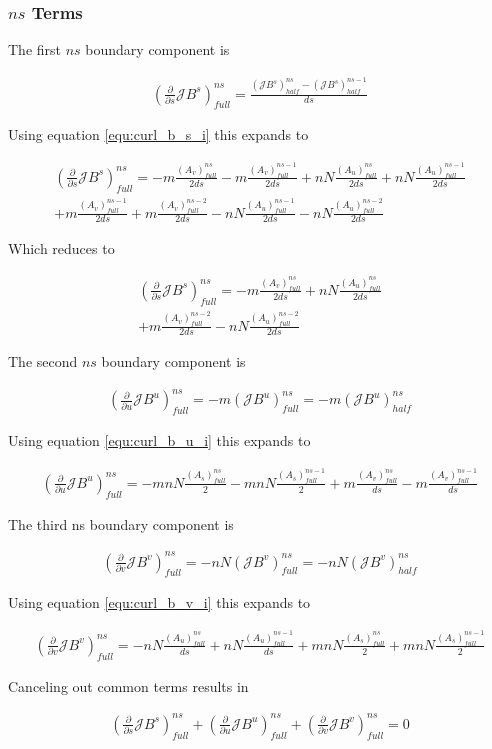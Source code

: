 \documentclass[11pt]{article}
\newcommand{\brackets}[1]{\left(#1\right)}
\newcommand{\equ}[2]{
	\begin{equation}
    \begin{split}
	#1
	\label{#2}
	\end{split}
	\end{equation}
}
\begin{document}
\subsubsection{$ns$ Terms}
The first $ns$ boundary component is
\equ{
\brackets{\frac{\partial}{\partial s}\mathcal{J}B^{s}}^{ns}_{full}=\frac{\brackets{\mathcal{J}B^{s}}^{ns}_{half}-\brackets{\mathcal{J}B^{s}}^{ns-1}_{half}}{ds}
}{equ:div_jb_s_ns}
Using equation \ref{equ:curl_b_s_i} this expands to
\equ{
\brackets{\frac{\partial}{\partial s}\mathcal{J}B^{s}}^{ns}_{full}=-m\frac{\brackets{A_{v}}^{ns}_{full}}{2ds}-m\frac{\brackets{A_{v}}^{ns-1}_{full}}{2ds}+nN\frac{\brackets{A_{u}}^{ns}_{full}}{2ds}+nN\frac{\brackets{A_{u}}^{ns-1}_{full}}{2ds}\\
+m\frac{\brackets{A_{v}}^{ns-1}_{full}}{2ds}+m\frac{\brackets{A_{v}}^{ns-2}_{full}}{2ds}-nN\frac{\brackets{A_{u}}^{ns-1}_{full}}{2ds}-nN\frac{\brackets{A_{u}}^{ns-2}_{full}}{2ds}
}{equ:div_jb_s_ns_1}
Which reduces to
\equ{
\brackets{\frac{\partial}{\partial s}\mathcal{J}B^{s}}^{ns}_{full}=-m\frac{\brackets{A_{v}}^{ns}_{full}}{2ds}+nN\frac{\brackets{A_{u}}^{ns}_{full}}{2ds}\\
+m\frac{\brackets{A_{v}}^{ns-2}_{full}}{2ds}-nN\frac{\brackets{A_{u}}^{ns-2}_{full}}{2ds}
}{equ:div_jb_s_ns_2}

The second $ns$ boundary component is
\equ{
\brackets{\frac{\partial}{\partial u}\mathcal{J}B^{u}}^{ns}_{full}=-m\brackets{\mathcal{J}B^{u}}^{ns}_{full}=-m\brackets{\mathcal{J}B^{u}}^{ns}_{half}
}{equ:div_jb_u_ns}
Using equation \ref{equ:curl_b_u_i} this expands to
\equ{
\brackets{\frac{\partial}{\partial u}\mathcal{J}B^{u}}^{ns}_{full}=-mnN\frac{\brackets{A_{s}}^{ns}_{full}}{2}-mnN\frac{\brackets{A_{s}}^{ns-1}_{full}}{2}+m\frac{\brackets{A_{v}}^{ns}_{full}}{ds}-m\frac{\brackets{A_{v}}^{ns-1}_{full}}{ds}
}{equ:div_jb_u_ns_1}
The third ns boundary component is
\equ{
\brackets{\frac{\partial}{\partial v}\mathcal{J}B^{v}}^{ns}_{full}=-nN\brackets{\mathcal{J}B^{v}}^{ns}_{full}=-nN\brackets{\mathcal{J}B^{v}}^{ns}_{half}
}{equ:div_jb_v_ns}
Using equation \ref{equ:curl_b_v_i} this expands to
\equ{
\brackets{\frac{\partial}{\partial v}\mathcal{J}B^{v}}^{ns}_{full}=-nN\frac{\brackets{A_{u}}^{ns}_{full}}{ds}+nN\frac{\brackets{A_{u}}^{ns-1}_{full}}{ds}+mnN\frac{\brackets{A_{s}}^{ns}_{full}}{2}+mnN\frac{\brackets{A_{s}}^{ns-1}_{full}}{2}
}{equ:div_jb_v_ns_1}

Canceling out common terms results in
\equ{
\brackets{\frac{\partial}{\partial s}\mathcal{J}B^{s}}^{ns}_{full}+\brackets{\frac{\partial}{\partial u}\mathcal{J}B^{u}}^{ns}_{full}+\brackets{\frac{\partial}{\partial v}\mathcal{J}B^{v}}^{ns}_{full}=0
}{equ:div_total_ns_1}
\end{document}
